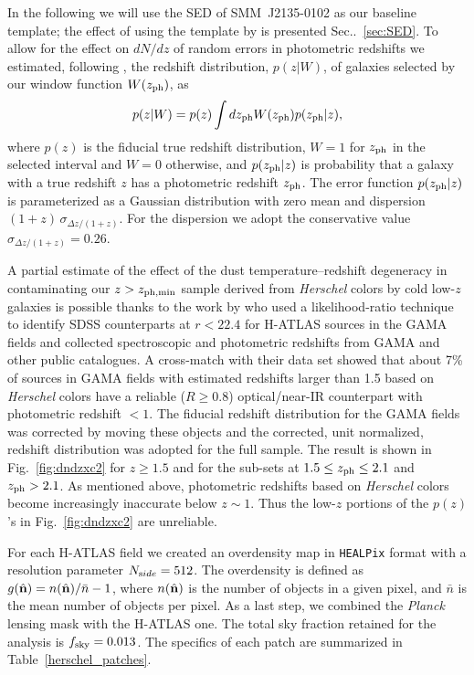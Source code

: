 In the following we will use the SED of SMM~J2135-0102 as our baseline template; the effect of using the template by \citet{Pearson2013} is presented Sec..~\eqref{sec:SED}. To allow for the effect on $dN/dz$ of random errors in photometric redshifts we estimated, following \citet{Budavari2003}, the redshift distribution, $p(z|W)$, of galaxies selected by our window function $W(z_{\rm{ph}})$,  as
%
\begin{equation}
p(z|W) = p(z) \int dz_{\rm{ph}} W(z_{\rm{ph}})p(z_{\rm{ph}}|z),
\end{equation}
%
where $p(z)$ is the fiducial true redshift distribution, $W=1$ for $z_{\rm{ph}}$ in the selected interval and $W=0$ otherwise, and $p(z_{\rm{ph}}|z)$ is probability that a galaxy with a true redshift $z$ has a photometric redshift $z_{\rm{ph}}$. The error function $p(z_{\rm{ph}}|z)$ is parameterized as a Gaussian distribution with zero mean and dispersion $(1+z)\,\sigma_{\Delta z/(1+z)}$. For the dispersion we adopt the conservative value $\sigma_{\Delta z/(1+z)}=0.26$.

A partial estimate of the effect of the dust temperature--redshift degeneracy in contaminating our $z> z_{\rm{ph, min}}$ sample derived from \textit{Herschel} colors by cold low-$z$ galaxies is possible thanks to the work by \citet{Bourne2016} who used a likelihood-ratio technique to identify SDSS counterparts at $r < 22.4$ for H-ATLAS sources in the GAMA fields and collected spectroscopic and photometric redshifts from GAMA and other public catalogues. A cross-match with their data set showed that about 7\% of sources in GAMA fields with estimated redshifts larger than 1.5 based on \textit{Herschel} colors have a reliable ($R \ge 0.8$) optical/near-IR counterpart with photometric redshift $<1$. The fiducial redshift distribution for the GAMA fields was corrected by moving these objects and the corrected, unit normalized, redshift distribution was adopted for the full sample. The result is shown in Fig.~\eqref{fig:dndzxc2} for $z\ge 1.5$ and for the sub-sets at $1.5\le z_{\rm{ph}} \le 2.1$ and $z_{\rm{ph}} > 2.1$. As mentioned above, photometric redshifts based on \textit{Herschel} colors become increasingly inaccurate below $z\sim 1$. Thus the low-$z$ portions of the $p(z)$'s in Fig.~\eqref{fig:dndzxc2} are unreliable.

For each H-ATLAS field we created an overdensity map in \texttt{HEALPix} format with a resolution parameter $N_{\rm side}=512$. The overdensity is defined as $g(\nver)= n(\nver)/\bar{n}-1$, where $n(\nver)$ is the number of objects in a given pixel, and $\bar{n}$ is the mean number of objects per pixel. As a last step, we combined the \emph{Planck} lensing mask with the H-ATLAS one. The total sky fraction retained for the analysis is $f_{\rm{sky}}=0.013$. The specifics of each patch are summarized in Table~\eqref{herschel_patches}.

